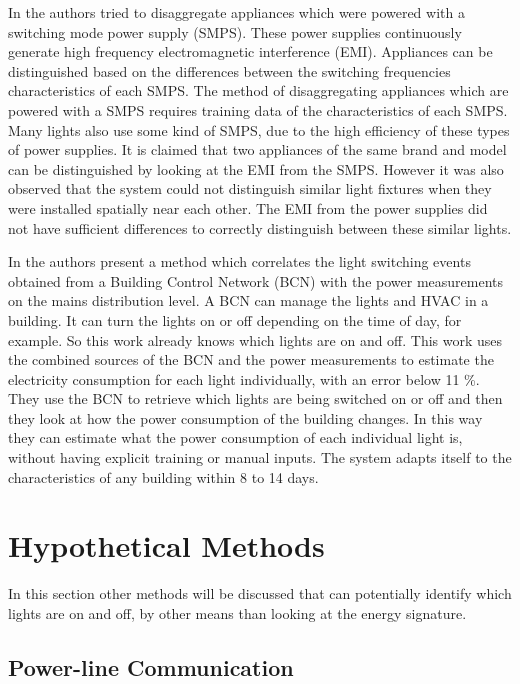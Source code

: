 		In \cite{Gupta:2010} the authors tried to disaggregate appliances which were powered with a switching mode power supply (SMPS).
		These power supplies continuously generate high frequency electromagnetic interference (EMI).
		Appliances can be distinguished based on the differences between the switching frequencies characteristics of each SMPS.
		The method of disaggregating appliances which are powered with a SMPS requires training data of the characteristics of each SMPS.  
		Many lights also use some kind of SMPS, due to the high efficiency of these types of power supplies.
		It is claimed that two appliances of the same brand and model can be distinguished by looking at the EMI from the SMPS.
		However it was also observed that the system could not distinguish similar light fixtures when they were installed spatially near each other.
		The EMI from the power supplies did not have sufficient differences to correctly distinguish between these similar lights. 


		In \cite{Englert:2016:LAE:2893711.2893724} the authors present a method which correlates the light switching events obtained from a Building Control Network (BCN) with the power measurements on the mains distribution level.
		A BCN can manage the lights and HVAC in a building.
		It can turn the lights on or off depending on the time of day, for example.
		So this work already knows which lights are on and off. 
		This work uses the combined sources of the BCN and the power measurements to estimate the electricity consumption for each light individually, with an error below 11 \%.
		They use the BCN to retrieve which lights are being switched on or off and then they look at how the power consumption of the building changes.
		In this way they can estimate what the power consumption of each individual light is, without having explicit training or manual inputs.
		The system adapts itself to the characteristics of any building within 8 to 14 days.



		

	\section{Hypothetical Methods}

		In this section other methods will be discussed that can potentially identify which lights are on and off, by other means than looking at the energy signature.




		\subsection{Power-line Communication}

